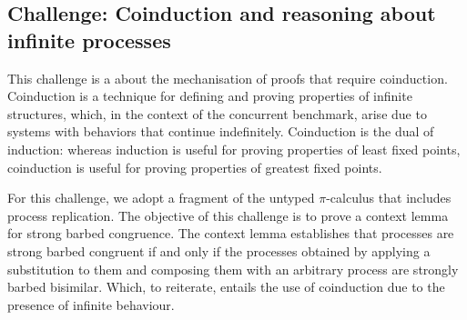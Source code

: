 \subsection{Challenge: Coinduction and reasoning about infinite processes}
\label{sec:challenge:coinduction}


This challenge is a about the mechanisation of proofs
that require coinduction.
%
Coinduction is a technique for defining and proving properties of
infinite structures,
%
which, in the context of the concurrent benchmark, arise
due to systems with behaviors that continue indefinitely.
%
Coinduction is the dual of induction: whereas induction is useful for
proving properties of least fixed points, coinduction is useful for
proving properties of greatest fixed points.
%
%

For this challenge, we adopt a fragment of the untyped $\pi$-calculus
that includes process replication.
The objective of this challenge is to prove a context lemma for strong barbed congruence.
The context lemma establishes that processes are strong barbed congruent if and only if the processes obtained by applying a substitution to them and composing them with an arbitrary process are strongly barbed bisimilar.
Which, to reiterate, entails the use of coinduction due to the presence of infinite behaviour.

